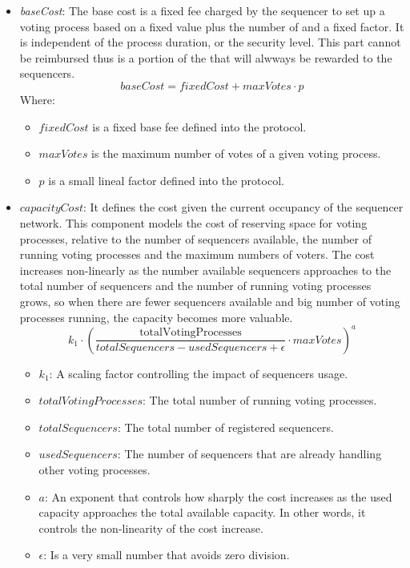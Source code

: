 \begin{itemize}
	\item \textit{baseCost}: The base cost is a fixed fee charged by the sequencer to set up a voting process based on a fixed value plus the number of and a fixed factor. It is independent of the process duration, or the security level. This part cannot be reimbursed thus is a portion of the that will alwways be rewarded to the sequencers.
		$$ baseCost = fixedCost + maxVotes \cdot p $$
		Where:
		\begin{itemize}
			\item $fixedCost$ is a fixed base fee defined into the protocol.
			\item $maxVotes$ is the maximum number of votes of a given voting process.
			\item $p$ is a small lineal factor defined into the protocol.
		\end{itemize}
	
	\item $capacityCost$: It defines the cost given the current occupancy of the sequencer network. This component models the cost of reserving space for voting processes, relative to the number of sequencers available, the number of running voting processes and the maximum numbers of voters. The cost increases non-linearly as the number available sequencers approaches to the total number of sequencers and the number of running voting processes grows, so when there are fewer sequencers available and big number of voting processes running, the capacity becomes more valuable.
		$$
		k_1 \cdot \left( \frac{\text{totalVotingProcesses}}{totalSequencers - usedSequencers + \epsilon} \cdot maxVotes \right)^a
		$$ 
		\begin{itemize}
			\item $k_1$: A scaling factor controlling the impact of sequencers usage.
			\item $totalVotingProcesses$: The total number of running voting processes.
			\item $totalSequencers$: The total number of registered sequencers.
			\item $usedSequencers$: The number of sequencers that are already handling other voting processes.
			\item $a$: An exponent that controls how sharply the cost increases as the used capacity approaches the total available capacity. In other words, it controls the non-linearity of the cost increase.
			\item $\epsilon$: Is a very small number that avoids zero division.
		\end{itemize}
	

\end{itemize}
